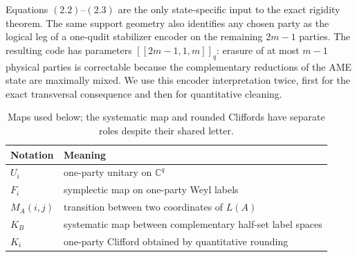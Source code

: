 Equations \((2.2)\)--\((2.3)\) are the only state-specific input to the
exact rigidity theorem.  The same support geometry also identifies any
chosen party as the logical leg of a one-qudit stabilizer encoder on the
remaining \(2m-1\) parties.  The resulting code has parameters
\([[2m-1,1,m]]_q\): erasure of at most \(m-1\) physical parties is
correctable because the complementary reductions of the AME state are
maximally mixed.  We use this encoder interpretation twice, first for the
exact transversal consequence and then for quantitative cleaning.

\begin{table}[H]
\centering
\caption{Maps used below; the systematic map and rounded Cliffords have
separate roles despite their shared letter.}
\label{tab:map-notation}
\begin{tabular}{@{}ll@{}}
\toprule
Notation & Meaning \\
\midrule
\(U_i\) & one-party unitary on \(\mathbb C^q\) \\
\(F_i\) & symplectic map on one-party Weyl labels \\
\(M_A(i,j)\) & transition between two coordinates of \(L(A)\) \\
\(K_B\) & systematic map between complementary half-set label spaces \\
\(K_i\) & one-party Clifford obtained by quantitative rounding \\
\bottomrule
\end{tabular}
\end{table}

